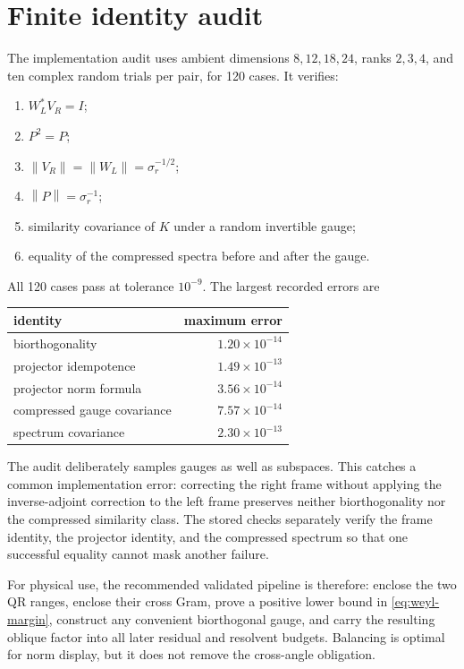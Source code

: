 \documentclass[12pt]{article}
\theoremstyle{remark}
\newcommand{\norm}[1]{\left\lVert#1\right\rVert}
\begin{document}
\section{Finite identity audit}

The implementation audit uses ambient dimensions $8,12,18,24$, ranks
$2,3,4$, and ten complex random trials per pair, for 120 cases.  It verifies:
\begin{enumerate}[leftmargin=2em]
\item $W_L^*V_R=I$;
\item $P^2=P$;
\item $\norm{V_R}=\norm{W_L}=\sigma_r^{-1/2}$;
\item $\norm P=\sigma_r^{-1}$;
\item similarity covariance of $K$ under a random invertible gauge;
\item equality of the compressed spectra before and after the gauge.
\end{enumerate}

All 120 cases pass at tolerance $10^{-9}$.  The largest recorded errors are
\begin{center}
\begin{tabular}{lr}
\toprule
identity & maximum error\\
\midrule
biorthogonality & $1.20\times10^{-14}$\\
projector idempotence & $1.49\times10^{-13}$\\
projector norm formula & $3.56\times10^{-14}$\\
compressed gauge covariance & $7.57\times10^{-14}$\\
spectrum covariance & $2.30\times10^{-13}$\\
\bottomrule
\end{tabular}
\end{center}

The audit deliberately samples gauges as well as subspaces.  This catches a
common implementation error: correcting the right frame without applying
the inverse-adjoint correction to the left frame preserves neither
biorthogonality nor the compressed similarity class.  The stored checks
separately verify the frame identity, the projector identity, and the
compressed spectrum so that one successful equality cannot mask another
failure.

For physical use, the recommended validated pipeline is therefore: enclose
the two QR ranges, enclose their cross Gram, prove a positive lower bound in
\eqref{eq:weyl-margin}, construct any convenient biorthogonal gauge, and
carry the resulting oblique factor into all later residual and resolvent
budgets.  Balancing is optimal for norm display, but it does not remove the
cross-angle obligation.
\end{document}
